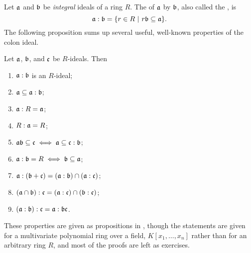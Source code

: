 Let $\frak a$ and $\frak b$ be \emph{integral} ideals of a ring $R$.
The  of $\frak a$ by $\frak b$, also called the , is
\[ \frak a : \frak b = \{ r \in R ~|~ r \frak b \subseteq \frak a \}. \]
The following proposition sums up several useful, well-known properties of the colon ideal.
\begin{proposition}
  \label{prop_colon_ideal}
  Let $\frak a$, $\frak b$, and $\frak c$ be $R$-ideals. Then
  \begin{enumerate}[label=(\roman*)]
    \item $\frak a : \frak b$ is an $R$-ideal;
    \item $\frak a \subseteq \frak a : \frak b$;
    \item $\frak a : R = \frak a$;
    \item $R : \frak a = R$;
    \item $\frak a \frak b \subseteq \frak c \iff \frak a \subseteq \frak c : \frak b$;
    \item $\frak a : \frak b = R \iff \frak b \subseteq \frak a$;
    \item $\frak a : (\frak b + \frak c) = (\frak a : \frak b) \cap (\frak a : \frak c)$;
    \item $(\frak a \cap \frak b) : \frak c = (\frak a : \frak c) \cap (\frak b : \frak c)$;
    \item $(\frak a : \frak b) : \frak c = \frak a : \frak b \frak c$.
  \end{enumerate}
\end{proposition}
These properties are given as propositions in \cite{cox07},
though the statements are given for a multivariate polynomial ring over a field, $K[x_1, \ldots, x_n]$
rather than for an arbitrary  ring  $R$,
and most of the proofs are left as exercises.

